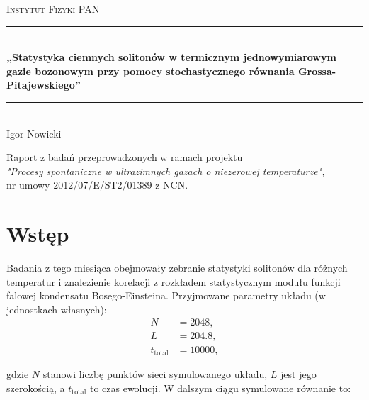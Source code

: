\documentclass[12pt]{article}
\numberwithin{equation}{section}
\theoremstyle{definition}
\newcommand{\HRule}{\rule{\linewidth}{0.5mm}}
\begin{document}
\begin{titlepage}
\begin{center}


\textsc{\LARGE Instytut Fizyki PAN}\\[1.5cm]


\HRule \\[0.4cm]
{ \huge \bfseries „Statystyka ciemnych solitonów w termicznym jednowymiarowym
gazie bozonowym przy pomocy stochastycznego równania
 Grossa-Pitajewskiego” \\[0.4cm] }

\HRule \\[1.5cm]

\noindent
\large Igor Nowicki
\\[2cm]
\begin{flushleft}
Raport z badań przeprowadzonych w ramach projektu\\
\emph{"Procesy spontaniczne w ultrazimnych gazach o niezerowej temperaturze",}\\[1cm]
nr umowy 2012/07/E/ST2/01389 z NCN.\\[2cm]
\end{flushleft}


\end{center}
\end{titlepage}

\newcommand{\dx}{\Delta x}
\section{Wstęp}
Badania z tego miesiąca obejmowały zebranie statystyki solitonów dla różnych temperatur i znalezienie korelacji z rozkładem statystycznym modułu funkcji falowej kondensatu Bosego-Einsteina. Przyjmowane parametry układu (w jednostkach własnych):
\begin{align*}
N &= 2048,\\
L &= 204.8,\\
t_\text{total}&=10000,
\end{align*}

gdzie $N$ stanowi liczbę punktów sieci symulowanego układu, $L$ jest jego szerokością, a $t_\text{total}$ to czas ewolucji. W dalszym ciągu symulowane równanie to:
\end{document}
